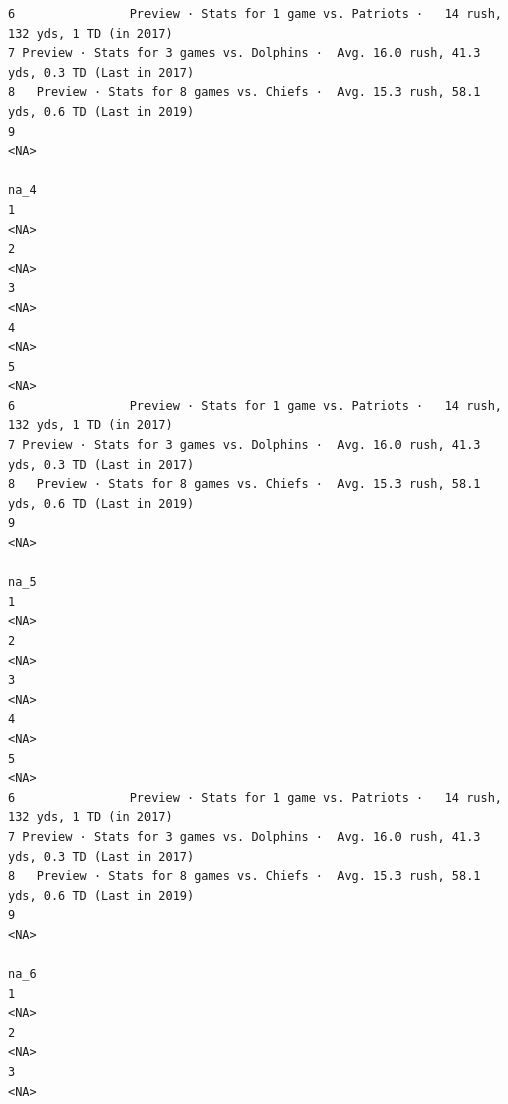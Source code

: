 \documentclass[
]{article}
\begin{document}
\begin{verbatim}
6                Preview · Stats for 1 game vs. Patriots ·   14 rush, 132 yds, 1 TD (in 2017)
7 Preview · Stats for 3 games vs. Dolphins ·  Avg. 16.0 rush, 41.3 yds, 0.3 TD (Last in 2017)
8   Preview · Stats for 8 games vs. Chiefs ·  Avg. 15.3 rush, 58.1 yds, 0.6 TD (Last in 2019)
9                                                                                        <NA>
                                                                                         na_4
1                                                                                        <NA>
2                                                                                        <NA>
3                                                                                        <NA>
4                                                                                        <NA>
5                                                                                        <NA>
6                Preview · Stats for 1 game vs. Patriots ·   14 rush, 132 yds, 1 TD (in 2017)
7 Preview · Stats for 3 games vs. Dolphins ·  Avg. 16.0 rush, 41.3 yds, 0.3 TD (Last in 2017)
8   Preview · Stats for 8 games vs. Chiefs ·  Avg. 15.3 rush, 58.1 yds, 0.6 TD (Last in 2019)
9                                                                                        <NA>
                                                                                         na_5
1                                                                                        <NA>
2                                                                                        <NA>
3                                                                                        <NA>
4                                                                                        <NA>
5                                                                                        <NA>
6                Preview · Stats for 1 game vs. Patriots ·   14 rush, 132 yds, 1 TD (in 2017)
7 Preview · Stats for 3 games vs. Dolphins ·  Avg. 16.0 rush, 41.3 yds, 0.3 TD (Last in 2017)
8   Preview · Stats for 8 games vs. Chiefs ·  Avg. 15.3 rush, 58.1 yds, 0.6 TD (Last in 2019)
9                                                                                        <NA>
                                                                                         na_6
1                                                                                        <NA>
2                                                                                        <NA>
3                                                                                        <NA>

\end{verbatim}
\end{document}
